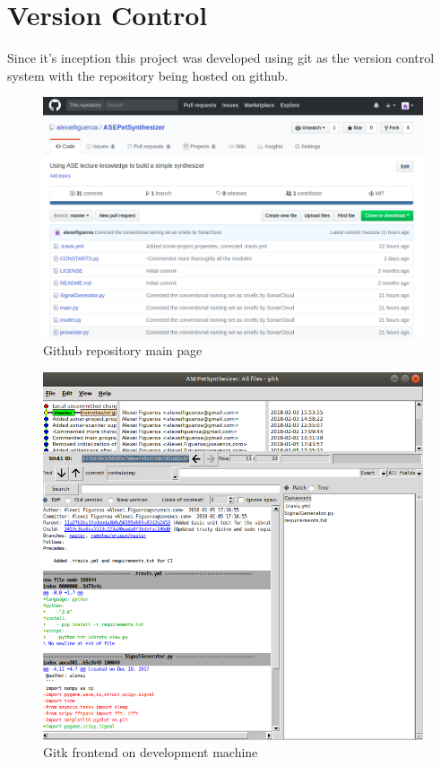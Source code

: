 \documentclass[margin,line,a4paper,authoryear,12pt]{report}
\begin{document}
\section{Version Control}
Since it's inception this project was developed using git as the version control system with the repository being hosted on github.
\begin{figure}[h!]
    \centering
    \includegraphics[width=0.8\linewidth]{github.png}
    \caption{Github repository main page}
    \label{fig:github}
\end{figure}
\begin{figure}[h!]
    \centering
    \includegraphics[width=0.8\linewidth]{gitk.png}
    \caption{Gitk frontend on development machine}
    \label{fig:gitk}
\end{figure}
\end{document}

